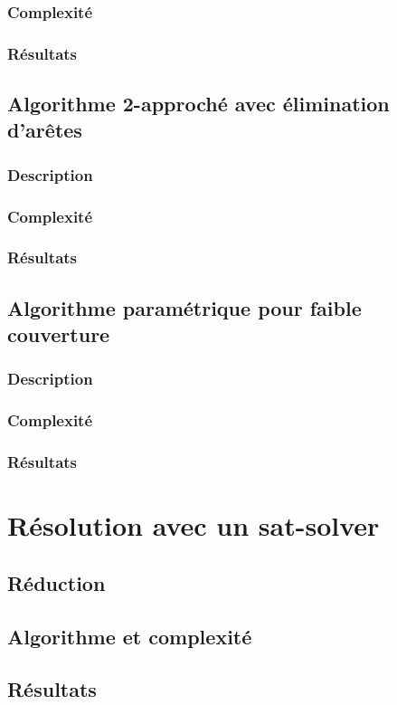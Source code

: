 \documentclass[a4paper,10pt]{article}
\begin{document}
\subsubsection{Complexité}

\subsubsection{Résultats}


\subsection{Algorithme 2-approché avec élimination d'arêtes}

\subsubsection{Description}

\subsubsection{Complexité}

\subsubsection{Résultats}


\subsection{Algorithme paramétrique pour faible couverture}

\subsubsection{Description}

\subsubsection{Complexité}

\subsubsection{Résultats}


\section{Résolution avec un sat-solver}


\subsection{Réduction}

\subsection{Algorithme et complexité}


\subsection{Résultats}
\end{document}
